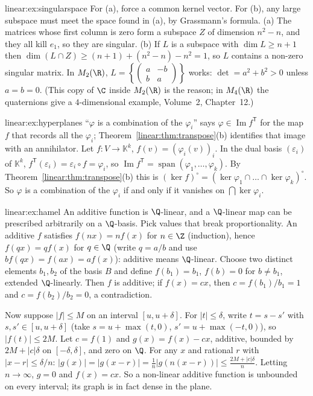 \begin{solution}{linear:ex:singularspace}
\idea For (a), force a common kernel vector. For (b), any large subspace must meet the space found in (a), by
Grassmann's formula.
\writeup (a) The matrices whose first column is zero form a subspace $Z$ of dimension $n^2-n$, and they all kill $e_1$,
so they are singular. (b) If $L$ is a subspace with $\dim L\ge n+1$ then $\dim(L\cap Z)\ge(n+1)+(n^2-n)-n^2=1$, so $L$
contains a non-zero singular matrix. In $M_2(\R)$, $L=\left\{\begin{pmatrix}a&-b\\b&a\end{pmatrix}\right\}$ works:
$\det=a^2+b^2>0$ unless $a=b=0$. (This copy of $\C$ inside $M_2(\R)$ is the reason; in $M_4(\R)$ the quaternions give a
$4$-dimensional example, Volume~2, Chapter~12.)
\end{solution}

\begin{solution}{linear:ex:hyperplanes}
\idea ``$\varphi$ is a combination of the $\varphi_i$'' says $\varphi\in\operatorname{Im}f^{\mathsf T}$ for the map $f$ that
records all the $\varphi_i$; Theorem~\ref{linear:thm:transpose}(b) identifies that image with an annihilator.
\writeup Let $f:V\to\mathbb K^k$, $f(v)=(\varphi_i(v))_i$. In the dual basis $(\varepsilon_i)$ of $\mathbb K^k$,
$f^{\mathsf T}(\varepsilon_i)=\varepsilon_i\circ f=\varphi_i$, so $\operatorname{Im}f^{\mathsf T}=\operatorname{span}(\varphi_1,\dots,\varphi_k)$.
By Theorem~\ref{linear:thm:transpose}(b) this is $(\ker f)^\circ=(\ker\varphi_1\cap\dots\cap\ker\varphi_k)^\circ$. So $\varphi$ is a
combination of the $\varphi_i$ if and only if it vanishes on $\bigcap\ker\varphi_i$.
\end{solution}

\begin{solution}{linear:ex:hamel}
\idea An additive function is $\Q$-linear, and a $\Q$-linear map can be prescribed arbitrarily on a $\Q$-basis. Pick
values that break proportionality.
\writeup An additive $f$ satisfies $f(nx)=nf(x)$ for $n\in\Z$ (induction), hence $f(qx)=qf(x)$ for $q\in\Q$ (write
$q=a/b$ and use $bf(qx)=f(ax)=af(x)$): additive means $\Q$-linear. Choose two distinct elements $b_1,b_2$ of the basis $B$
and define $f(b_1)=b_1$, $f(b)=0$ for $b\ne b_1$, extended $\Q$-linearly. Then $f$ is additive; if $f(x)=cx$, then
$c=f(b_1)/b_1=1$ and $c=f(b_2)/b_2=0$, a contradiction.

Now suppose $|f|\le M$ on an interval $[u,u+\delta]$. For $|t|\le\delta$, write $t=s-s'$ with $s,s'\in[u,u+\delta]$
(take $s=u+\max(t,0)$, $s'=u+\max(-t,0)$), so $|f(t)|\le2M$. Let $c=f(1)$ and $g(x)=f(x)-cx$, additive, bounded by
$2M+|c|\delta$ on $[-\delta,\delta]$, and zero on $\Q$. For any $x$ and rational $r$ with $|x-r|\le\delta/n$:
$|g(x)|=|g(x-r)|=\frac1n|g(n(x-r))|\le\frac{2M+|c|\delta}n$. Letting $n\to\infty$, $g=0$ and $f(x)=cx$. So a non-linear
additive function is unbounded on every interval; its graph is in fact dense in the plane.
\end{solution}

